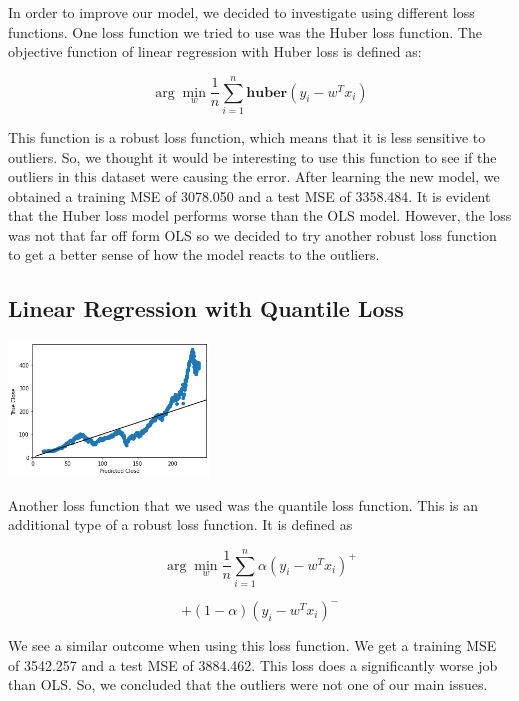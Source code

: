 \documentclass[final,5p,times,twocolumn,authoryear, 12pt]{elsarticle}
\begin{document}
In order to improve our model, we decided to investigate using different loss functions. One loss function we tried to use was the Huber loss function.  The objective function of linear regression with Huber loss is defined as:

\begin{adjustwidth}{1cm}{}
    \[
        \arg \min_w \frac{1}{n} \sum_{i = 1}^{n} \textbf{huber}(y_i - w^T x_i)
    \]
\end{adjustwidth}

This function is a robust loss function, which means that it is less sensitive to outliers. So, we thought it would be interesting to use this function to see if the outliers in this dataset were causing the error. After learning the new model, we obtained a training MSE of 3078.050 and a test MSE of 3358.484. It is evident that the Huber loss model performs worse than the OLS model. However, the loss was not that far off form OLS so we decided to try another robust loss function to get a better sense of how the model reacts to the outliers.

\subsection{Linear Regression with Quantile Loss}

\includegraphics[width=0.4\textwidth, angle=0]{linregQ.png}		

Another loss function that we used was the quantile loss function. This is an additional type of a robust loss function. It is defined as 

\begin{adjustwidth}{1.4cm}{}
    \[
        \arg \min_w \frac{1}{n} \sum_{i = 1}^{n} \alpha (y_i - w^Tx_i)^+
    \]
\end{adjustwidth}
\begin{adjustwidth}{2.0cm}{}
    \[
        + (1 - \alpha) (y_i - w^Tx_i)^-
    \]
\end{adjustwidth}

We see a similar outcome when using this loss function. We get a training MSE of 3542.257 and a test MSE of 3884.462. This loss does a significantly worse job than OLS. So, we concluded that the outliers were not one of our main issues.
\end{document}
